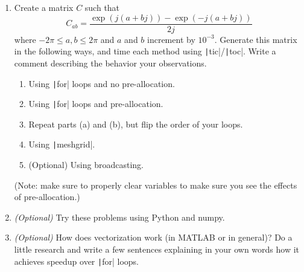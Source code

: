 \documentclass{article}
\begin{document}
\begin{enumerate}
\item Create a matrix $C$ such that
  \begin{equation*}
    C_{ab}=\frac{\exp(j(a+bj))-\exp(-j(a+bj))}{2j}
  \end{equation*}
  where $-2\pi\le a,b\le 2\pi$ and $a$ and $b$ increment by $10^{-3}$. Generate this matrix in the following ways, and time each method using \texttt|tic|/\texttt|toc|. Write a comment describing the behavior your observations.
  \begin{enumerate}
  \item Using \texttt|for| loops and no pre-allocation.
  \item Using \texttt|for| loops and pre-allocation.
  \item Repeat parts (a) and (b), but flip the order of your loops.
  \item Using \texttt|meshgrid|.
  \item (Optional) Using broadcasting.
  \end{enumerate}

  (Note: make sure to properly clear variables to make sure you see the effects of pre-allocation.)
    
\item \textit{(Optional)} Try these problems using Python and numpy.
  
\item \textit{(Optional)} How does vectorization work (in MATLAB or in general)? Do a little research and write a few sentences explaining in your own words how it achieves speedup over \texttt|for| loops.
\end{enumerate}
\end{document}
